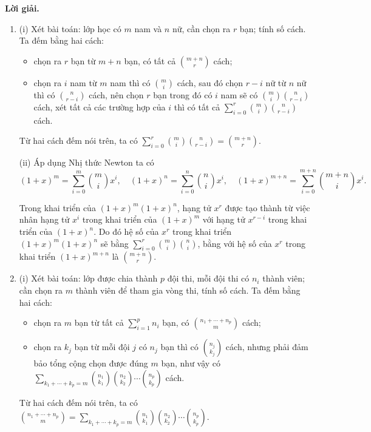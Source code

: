 \documentclass[a4paper, 11pt]{article}
\theoremstyle{definition}
\begin{document}
	\textbf{Lời giải. }
	\begin{enumerate}[label=(\alph*)]
		\item (i) Xét bài toán: lớp học có $m$ nam và $n$ nữ, cần chọn ra $r$ bạn; tính số cách. Ta đếm bằng hai cách: \begin{itemize}
			\item chọn ra $r$ bạn từ $m+n$ bạn, có tất cả $\displaystyle {m+n \choose r}$ cách;
			\item chọn ra $i$ nam từ $m$ nam thì có $\displaystyle {m \choose i}$ cách, sau đó chọn $r-i$ nữ từ $n$ nữ thì có $\displaystyle {n \choose r-i}$ cách, nên chọn $r$ bạn trong đó có $i$ nam sẽ có $\displaystyle{m \choose i}{n \choose r-i}$ cách, xét tất cả các trường hợp của $i$ thì có tất cả $\displaystyle\sum\limits_{i=0}^r {m \choose i} {n \choose r-i}$ cách.
		\end{itemize}
		Từ hai cách đếm nói trên, ta có $\displaystyle\sum\limits_{i=0}^r {m \choose i} {n \choose r-i} = {m+n \choose r}$.

		(ii) Áp dụng Nhị thức Newton ta có 
		$$\displaystyle(1+x)^m = \sum\limits_{i=0}^m{m \choose i}x^i,\quad (1+x)^n  = \sum\limits_{i=0}^n{n\choose i}x^i,\quad (1+x)^{m+n}  = \sum\limits_{i=0}^{m+n}{{m+n}\choose i}x^i.$$

		Trong khai triển của $(1+x)^m(1+x)^n$, hạng tử $x^r$ được tạo thành từ việc nhân hạng tử $x^i$ trong khai triển của $(1+x)^m$ với hạng tử $x^{r-i}$ trong khai triển của $(1+x)^n$. Do đó hệ số của $x^r$ trong khai triển $(1+x)^m(1+x)^n$ sẽ bằng $\displaystyle\sum\limits_{i=0}^r{m \choose i}{n\choose i}$, bằng với hệ số của $x^r$ trong khai triển $(1+x)^{m+n}$ là $\displaystyle{m+n\choose r}$.
		\item (i) Xét bài toán: lớp được chia thành $p$ đội thi, mỗi đội thi có $n_i$ thành viên; cần chọn ra $m$ thành viên để tham gia vòng thi, tính số cách. Ta đếm bằng hai cách:
		\begin{itemize}
			\item chọn ra $m$ bạn từ tất cả $\displaystyle\sum\limits_{i=1}^p n_i$ bạn, có $\displaystyle {n_1 + \cdots + n_p \choose m}$ cách;
			\item chọn ra $k_j$ bạn từ mỗi đội $j$ có $n_j$ bạn thì có $\displaystyle {n_j \choose k_j}$ cách, nhưng phải đảm bảo tổng cộng chọn được đúng $m$ bạn, như vậy có $
			\displaystyle\sum\limits_{k_1+\cdots+k_p = m} {n_1\choose k_1}{n_2\choose k_2}\cdots{n_p\choose k_p}$ cách.
		\end{itemize}
		Từ hai cách đếm nói trên, ta có $\displaystyle{n_1 + \cdots + n_p \choose m} = \sum\limits_{k_1+\cdots+k_p = m} {n_1\choose k_1}{n_2\choose k_2}\cdots{n_p\choose k_p}$.


\end{enumerate}
\end{document}
